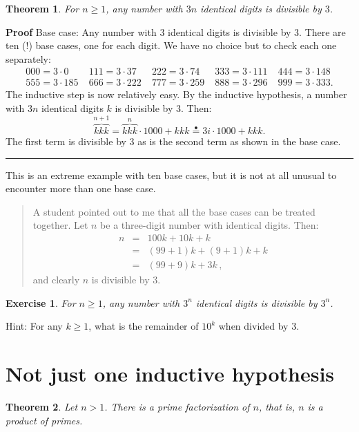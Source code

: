 \documentclass[11pt,a4paper]{report}
\newcommand*{\ih}{\stackrel{\bullet}{=}}
\newcommand*{\qed}{\hfill\rule{1ex}{1.5ex}}
\newtheorem{theorem}{Theorem}
\newtheorem{exercise}{Exercise}
\begin{document}
\begin{theorem}\label{th.three}
For $n\geq 1$, any number with $3n$ identical digits is divisible by $3$.
\end{theorem}

\textbf{Proof} Base case: Any number with $3$ identical digits is divisible by $3$. There are ten (!) base cases, one for each digit. We have no choice but to check each one separately:
\[
\begin{array}{lllll}
000=3\cdot 0 & \;111 = 3\cdot 37 & \;222 = 3\cdot 74 &
\;333=3\cdot 111 & \;444=3\cdot 148\\
555=3\cdot 185 & \;666=3\cdot 222 & \;777=3\cdot 259 &
\;888=3\cdot 296 & \;999=3\cdot 333.
\end{array}
\]
The inductive step is now relatively easy. By the inductive hypothesis, a number with $3n$ identical digits $k$ is divisible by $3$. Then:
\[
\overbrace{kkk}^{n+1} = \overbrace{kkk}^{n}\cdot 1000 + kkk \ih{}
3i\cdot 1000 + kkk.
\]
The first term is divisible by $3$ as is the second term as shown in the base case.\qed

This is an extreme example with ten base cases, but it is not at all unusual to encounter more than one base case.

\begin{quote}
A student pointed out to me that all the base cases can be treated together. Let $n$ be a three-digit number with identical digits. Then:
\begin{eqnarray*}
n &=& 100k + 10k +k\\
&=& (99+1)k + (9+1)k + k\\
&=& (99+9)k + 3k\,,
\end{eqnarray*}
and clearly $n$ is divisible by $3$.
\end{quote}

\begin{exercise}
For $n\geq 1$, any number with $3^n$ identical digits is divisible by $3^n$.
\end{exercise}

Hint: For any $k\geq 1$, what is the remainder of $10^k$ when divided by $3$.

\section{Not just one inductive hypothesis}

\begin{theorem}\label{t.prime}
Let $n>1$. There is a prime factorization of $n$, that is, $n$ is a product of primes.
\end{theorem}
\end{document}
